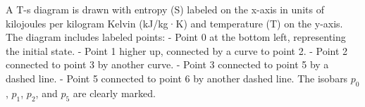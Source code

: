 A T-s diagram is drawn with entropy (S) labeled on the x-axis in units of kilojoules per kilogram Kelvin (kJ/kg·K) and temperature (T) on the y-axis. The diagram includes labeled points:  
- Point 0 at the bottom left, representing the initial state.  
- Point 1 higher up, connected by a curve to point 2.  
- Point 2 connected to point 3 by another curve.  
- Point 3 connected to point 5 by a dashed line.  
- Point 5 connected to point 6 by another dashed line.  
The isobars \( p_0 \), \( p_1 \), \( p_2 \), and \( p_5 \) are clearly marked.